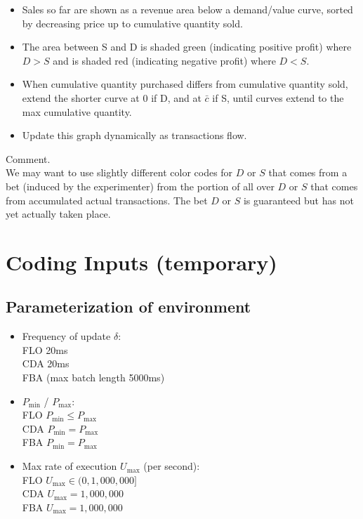 \documentclass{article}
\begin{document}
\begin{itemize}
\item Sales so far are shown as a revenue area below a demand/value curve, sorted by decreasing price up to cumulative quantity sold. 
    \item The area between S and D is shaded green (indicating positive profit) where $D>S$ and is shaded red (indicating negative profit) where $D<S$. 
\item When cumulative quantity purchased differs from cumulative quantity sold, extend the shorter curve at 0 if D, and at $\bar{c}$ if S, until curves extend to the max cumulative quantity.
\item Update this graph dynamically as transactions flow.
\end{itemize}

Comment. \\
We may want to use slightly different color codes for $D$ or $S$ that comes from a bet (induced by the experimenter) from the portion of all over $D$ or $S$ that comes from accumulated actual transactions. The bet $D$ or $S$ is guaranteed but has not yet actually taken place.

\section{Coding Inputs (temporary)}

\subsection*{Parameterization of environment}

\begin{itemize}

    \item Frequency of update $\delta$: \\
    FLO 20ms \\
    CDA 20ms \\
    FBA (max batch length 5000ms) 

    \item $P_{\min}$ / $P_{\max}$: \\
    FLO $P_{\min} \leq P_{\max}$ \\
    CDA $P_{\min} = P_{\max}$ \\
    FBA $P_{\min} = P_{\max}$ 

    \item Max rate of execution $U_{\max}$ (per second):  \\
    FLO $U_{\max} \in (0, 1,000,000]$ \\
    CDA $U_{\max} = 1,000,000$ \\ 
    FBA $U_{\max} = 1,000,000$ 
    
\end{itemize}
\end{document}
